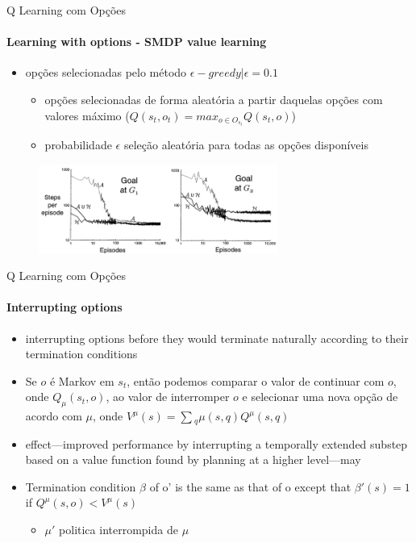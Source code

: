 \begin{frame}{Q Learning com Opções}
    \framesubtitle{Learning with options - SMDP value learning}
    \begin{itemize}
        \item opções selecionadas pelo método $\epsilon-greedy | \epsilon = 0.1$
        \begin{itemize}
            \item opções selecionadas de forma aleatória a partir daquelas opções com valores máximo ($Q(s_t, o_t) = max_{o \in O_{s_t}} Q(s_t, o)$)
            \item probabilidade $\epsilon$ seleção aleatória para todas as opções disponíveis
        \end{itemize}
    \end{itemize}
    \begin{figure}
        \centering
        \includegraphics[width=0.7\textwidth]{img/learningOptions.png}
        \label{figLearningOptions}
    \end{figure}
\end{frame}

\begin{frame}{Q Learning com Opções}
    \framesubtitle{Interrupting options}
    \begin{itemize}
        \item interrupting options before they would terminate naturally according to their termination conditions \nocite{Sutton1999a}
        \item Se $o$ é Markov em $s_t$, então podemos comparar o valor de continuar com $o$, onde $Q_\mu(s_t, o)$, ao valor de interromper $o$ e selecionar uma nova opção de acordo com $\mu$, onde $V^\mu(s)=\sum{_q}{\mu(s,q)Q^{\mu}(s,q)}$
        \item  effect—improved performance by interrupting a temporally extended substep based on a value function found by planning at a higher level—may
        \item Termination condition $\beta$ of o' is the same as that of o except that $β'(s) = 1$ if $Q^{\mu}(s,o) < V^{\mu}(s)$
        \begin{itemize}
            \item $\mu'$ politica interrompida de $\mu$
        \end{itemize}
    \end{itemize}
\end{frame}

